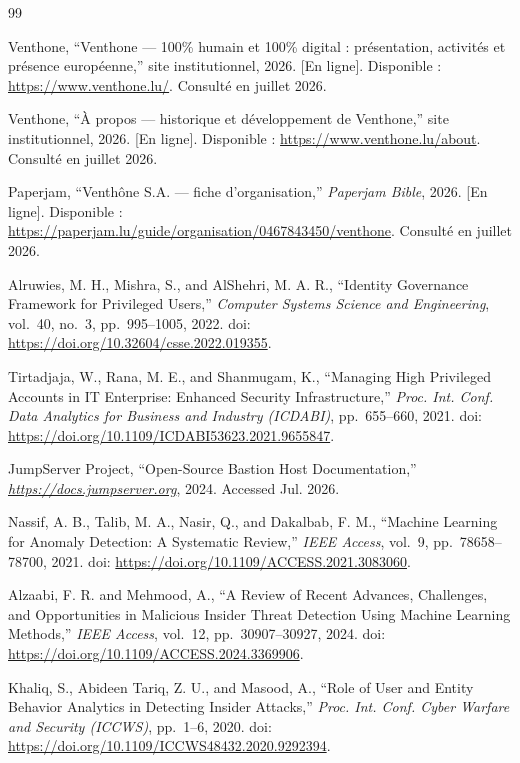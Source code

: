 \documentclass[11pt,a4paper,oneside]{report}
\theoremstyle{definition}
\theoremstyle{plain}
\begin{document}
\begin{thebibliography}{99}


{Venthone}, ``Venthone --- 100\% humain et 100\% digital : présentation, activités et présence européenne,'' site institutionnel, 2026. [En ligne]. Disponible : \url{https://www.venthone.lu/}. Consulté en juillet 2026.

{Venthone}, ``À propos --- historique et développement de Venthone,'' site institutionnel, 2026. [En ligne]. Disponible : \url{https://www.venthone.lu/about}. Consulté en juillet 2026.

{Paperjam}, ``Venthône S.A. --- fiche d'organisation,'' \emph{Paperjam Bible}, 2026. [En ligne]. Disponible : \url{https://paperjam.lu/guide/organisation/0467843450/venthone}. Consulté en juillet 2026.


Alruwies, M. H., Mishra, S., and AlShehri, M. A. R., ``Identity Governance Framework for Privileged Users,'' \emph{Computer Systems Science and Engineering}, vol.~40, no.~3, pp.~995--1005, 2022. doi: \url{https://doi.org/10.32604/csse.2022.019355}.

Tirtadjaja, W., Rana, M. E., and Shanmugam, K., ``Managing High Privileged Accounts in {IT} Enterprise: Enhanced Security Infrastructure,'' \emph{Proc. Int. Conf. Data Analytics for Business and Industry ({ICDABI})}, pp.~655--660, 2021. doi: \url{https://doi.org/10.1109/ICDABI53623.2021.9655847}.

{JumpServer Project}, ``Open-Source Bastion Host Documentation,'' \emph{\url{https://docs.jumpserver.org}}, 2024. Accessed Jul. 2026.

Nassif, A. B., Talib, M. A., Nasir, Q., and Dakalbab, F. M., ``Machine Learning for Anomaly Detection: A Systematic Review,'' \emph{IEEE Access}, vol.~9, pp.~78658--78700, 2021. doi: \url{https://doi.org/10.1109/ACCESS.2021.3083060}.

Alzaabi, F. R. and Mehmood, A., ``A Review of Recent Advances, Challenges, and Opportunities in Malicious Insider Threat Detection Using Machine Learning Methods,'' \emph{IEEE Access}, vol.~12, pp.~30907--30927, 2024. doi: \url{https://doi.org/10.1109/ACCESS.2024.3369906}.

Khaliq, S., Abideen Tariq, Z. U., and Masood, A., ``Role of User and Entity Behavior Analytics in Detecting Insider Attacks,'' \emph{Proc. Int. Conf. Cyber Warfare and Security ({ICCWS})}, pp.~1--6, 2020. doi: \url{https://doi.org/10.1109/ICCWS48432.2020.9292394}.


\end{thebibliography}
\end{document}
